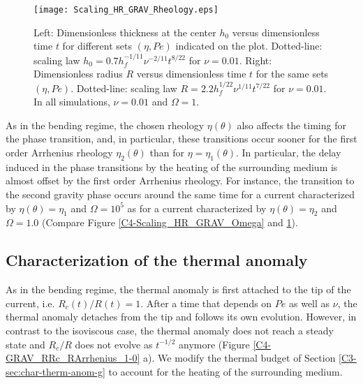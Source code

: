 \begin{figure}[h!]
  \begin{center}
    \graphicspath{ {/Users/thorey/Documents/These/Projet/Refroidissement/Skin_Model/Figure/Figure_Heating/} }
    \texttt{[image: Scaling\_HR\_GRAV\_Rheology.eps]}
    \caption{Left: Dimensionless thickness at  the center $h_0$ versus
      dimensionless time $t$ for  different sets $(\eta,Pe)$ indicated
      on      the      plot.        Dotted-line:      scaling      law
      $h_0= 0.7h_f^{-1/11}\nu^{-2/11}t^{8/22}$ for $\nu=0.01$.  Right:
      Dimensionless radius  $R$ versus dimensionless time  $t$ for the
      same    sets    $(\eta,Pe)$.      Dotted-line:    scaling    law
      $R=  2.2h_f^{1/22}\nu^{1/11}t^{7/22}$ for  $\nu  =0.01$. In  all
      simulations, $\nu=0.01$ and $\Omega=1$.}
    \label{C4-HR_GRAV_Rheology}
  \end{center}
\end{figure}

As  in the  bending regime,  the chosen  rheology $\eta(\theta)$  also
affects the timing for the phase transition, and, in particular, these
transitions  occur  sooner  for  the first  order  Arrhenius  rheology
$\eta_2(\theta)$ than  for $\eta=\eta_1(\theta)$.  In  particular, the
delay  induced  in  the  phase  transitions  by  the  heating  of  the
surrounding  medium is  almost  offset by  the  first order  Arrhenius
rheology.  For  instance, the transition  to the second  gravity phase
occurs  around   the  same  time   for  a  current   characterized  by
$\eta(\theta)   =\eta_1$   and   $\Omega=10^5$  as   for   a   current
characterized  by  $\eta(\theta)  =\eta_2$ and  $\Omega=1.0$  (Compare
Figure \ref{C4-Scaling_HR_GRAV_Omega} and \ref{C4-HR_GRAV_Rheology}).

\subsection{Characterization of the thermal anomaly}
\label{C4-sec:char-therm-anom-2}

As in the bending regime, the thermal anomaly is first attached to the
tip of the current, i.e. $R_c(t)/R(t)=1$. After a time that depends on
$Pe$ as well  as $\nu$, the thermal anomaly detaches  from the tip and
follows  its own  evolution. However,  in contrast  to the  isoviscous
case, the  thermal anomaly does not  reach a steady state  and $R_c/R$
does     not     evolve      as     $t^{-1/2}$     anymore     (Figure
\ref{C4-GRAV_RRc_RArrhenius_1-0} a).  We modify  the thermal budget of
Section \ref{C3-sec:char-therm-anom-g}  to account for the  heating of
the surrounding medium.

